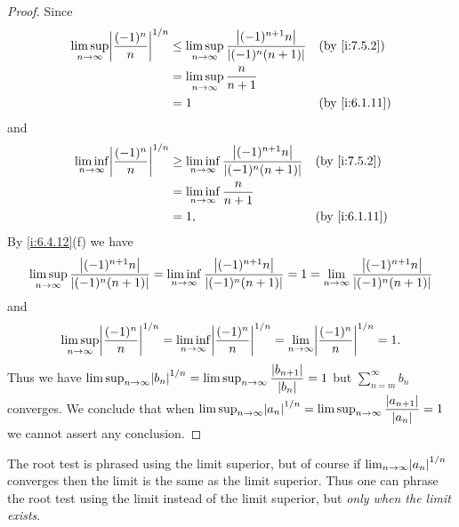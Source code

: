 \begin{proof}
  Since
  \begin{align*}
    \limsup_{n \to \infty} \abs{\dfrac{(-1)^n}{n}}^{1 / n} & \leq \limsup_{n \to \infty} \dfrac{\abs{(-1)^{n + 1} n}}{\abs{(-1)^n (n + 1)}} &  & \by{i:7.5.2}  \\
                                                           & = \limsup_{n \to \infty} \dfrac{n}{n + 1}                                                         \\
                                                           & = 1                                                                            &  & \by{i:6.1.11}
  \end{align*}
  and
  \begin{align*}
    \liminf_{n \to \infty} \abs{\dfrac{(-1)^n}{n}}^{1 / n} & \geq \liminf_{n \to \infty} \dfrac{\abs{(-1)^{n + 1} n}}{\abs{(-1)^n (n + 1)}} &  & \by{i:7.5.2}  \\
                                                           & = \liminf_{n \to \infty} \dfrac{n}{n + 1}                                                         \\
                                                           & = 1,                                                                           &  & \by{i:6.1.11}
  \end{align*}
  By \cref{i:6.4.12}(f) we have
  \[
    \limsup_{n \to \infty} \dfrac{\left\lvert(-1)^{n + 1} n\right\rvert}{\left\lvert(-1)^n (n + 1)\right\rvert} = \liminf_{n \to \infty} \dfrac{\left\lvert(-1)^{n + 1} n\right\rvert}{\left\lvert(-1)^n (n + 1)\right\rvert} = 1 = \lim_{n \to \infty} \dfrac{\left\lvert(-1)^{n + 1} n\right\rvert}{\left\lvert(-1)^n (n + 1)\right\rvert}
  \]
  and
  \[
    \limsup_{n \to \infty} \abs{\dfrac{(-1)^n}{n}}^{1 / n} = \liminf_{n \to \infty} \abs{\dfrac{(-1)^n}{n}}^{1 / n} = \lim_{n \to \infty} \abs{\dfrac{(-1)^n}{n}}^{1 / n} = 1.
  \]
  Thus we have \(\limsup_{n \to \infty} \abs{b_n}^{1 / n} = \limsup_{n \to \infty} \dfrac{\abs{b_{n + 1}}}{\abs{b_n}} = 1\) but \(\sum_{n = m}^\infty b_n\) converges.
  We conclude that when \(\limsup_{n \to \infty} \abs{a_n}^{1 / n} = \limsup_{n \to \infty} \dfrac{\abs{a_{n + 1}}}{\abs{a_n}} = 1\) we cannot assert any conclusion.
\end{proof}

\begin{note}
  The root test is phrased using the limit superior, but of course if \(\lim_{n \to \infty} \abs{a_n}^{1 / n}\) converges then the limit is the same as the limit superior.
  Thus one can phrase the root test using the limit instead of the limit superior, but \emph{only when the limit exists}.
\end{note}

